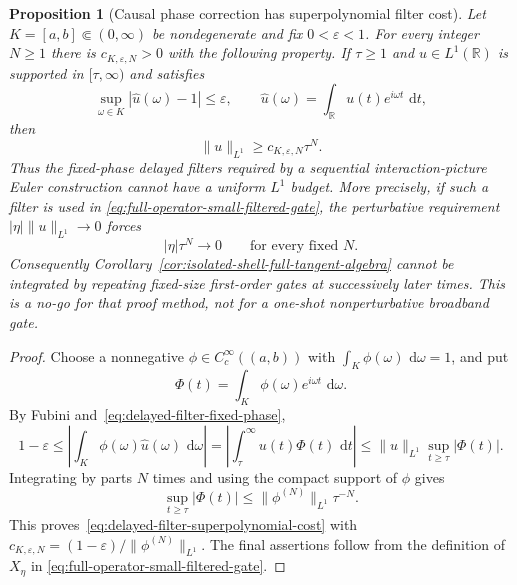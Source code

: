 \documentclass[11pt]{article}
\newtheorem{proposition}[theorem]{Proposition}
\theoremstyle{remark}
\newcommand{\dd}{\,\mathrm d}
\begin{document}
\begin{proposition}[Causal phase correction has superpolynomial filter cost]
\label{prop:causal-filter-cost}
Let $K=[a,b]\Subset(0,\infty)$ be nondegenerate and fix
$0<\varepsilon<1$.  For every integer $N\geq1$ there is
$c_{K,\varepsilon,N}>0$ with the following property.  If $\tau\geq1$ and
$u\in L^1(\mathbb R)$ is supported in $[\tau,\infty)$ and satisfies
\begin{equation}
 \sup_{\omega\in K}
 \left|\widehat u(\omega)-1\right|\leq\varepsilon,
 \qquad
 \widehat u(\omega)=\int_{\mathbb R}u(t)e^{i\omega t}\,\dd t,
 \label{eq:delayed-filter-fixed-phase}
\end{equation}
then
\begin{equation}
 \|u\|_{L^1}\geq c_{K,\varepsilon,N}\tau^N .
 \label{eq:delayed-filter-superpolynomial-cost}
\end{equation}
Thus the fixed-phase delayed filters required by a sequential
interaction-picture Euler construction cannot have a uniform $L^1$ budget.
More precisely, if such a filter is used in
\eqref{eq:full-operator-small-filtered-gate}, the perturbative requirement
$|\eta|\|u\|_{L^1}\to0$ forces
\[
 |\eta|\tau^N\longrightarrow0
 \qquad\text{for every fixed }N.
\]
Consequently Corollary~\ref{cor:isolated-shell-full-tangent-algebra} cannot
be integrated by repeating fixed-size first-order gates at successively
later times.  This is a no-go for that proof method, not for a one-shot
nonperturbative broadband gate.
\end{proposition}

\begin{proof}
Choose a nonnegative $\phi\in C_c^\infty((a,b))$ with
$\int_K\phi(\omega)\,\dd\omega=1$, and put
\[
 \Phi(t)=\int_K\phi(\omega)e^{i\omega t}\,\dd\omega .
\]
By Fubini and~\eqref{eq:delayed-filter-fixed-phase},
\[
 1-\varepsilon
 \leq
 \left|\int_K\phi(\omega)\widehat u(\omega)\,\dd\omega\right|
 =
 \left|\int_\tau^\infty u(t)\Phi(t)\,\dd t\right|
 \leq
 \|u\|_{L^1}\sup_{t\geq\tau}|\Phi(t)|.
\]
Integrating by parts $N$ times and using the compact support of $\phi$ gives
\[
 \sup_{t\geq\tau}|\Phi(t)|
 \leq
 \|\phi^{(N)}\|_{L^1}\tau^{-N}.
\]
This proves~\eqref{eq:delayed-filter-superpolynomial-cost} with
$c_{K,\varepsilon,N}=(1-\varepsilon)/\|\phi^{(N)}\|_{L^1}$.  The final
assertions follow from the definition of $X_\eta$ in
\eqref{eq:full-operator-small-filtered-gate}.
\end{proof}
\end{document}
